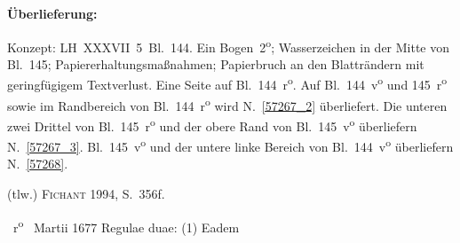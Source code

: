 %  
%
%
%
\frenchspacing
%
\begin{ledgroupsized}[r]{120mm}
\footnotesize
\pstart
\noindent\textbf{Überlieferung:}
\pend
\end{ledgroupsized}
%
\begin{ledgroupsized}[r]{114mm}
\footnotesize
\pstart \parindent -6mm
%
Konzept:
LH~XXXVII~5~Bl.~144. %
Ein Bogen~2\textsuperscript{o};
Wasserzeichen in der Mitte von Bl.~145;
Papiererhaltungsmaßnahmen;
Papierbruch an den Blatträndern mit geringfügigem Textverlust.
Eine Seite auf Bl.~144~r\textsuperscript{o}.
Auf Bl.~144~v\textsuperscript{o} und 145~r\textsuperscript{o} sowie im Randbereich von Bl.~144~r\textsuperscript{o} wird N.~\ref{57267_2} überliefert.
Die unteren zwei Drittel von Bl.~145~r\textsuperscript{o} und der obere Rand von Bl.~145~v\textsuperscript{o} überliefern N.~\ref{57267_3}.
Bl.~145~v\textsuperscript{o} und der untere linke Bereich von Bl.~144~v\textsuperscript{o} überliefern N.~\ref{57268}.
\pend
\end{ledgroupsized}
%
\begin{ledgroupsized}[r]{114mm}
\footnotesize
\pstart
\parindent -6mm
%
(tlw.) \textsc{Fichant} 1994, S.~356f.\cite{01056}
\pend%
\end{ledgroupsized}
%
%
\frenchspacing
\vspace{8mm}
\pstart%
\normalsize%
\noindent%
~r\textsuperscript{o}\rbrack\
\pend
%
\pstart
\noindent
\raggedleft
Martii 1677
\pend
\count{}%
\count{}%
\count{}
%
\pstart\noindent
\hspace{1mm}\hspace{-1mm}%
%
%
%
Regulae duae:
\pend
%
\pstart
(1) Eadem
%
